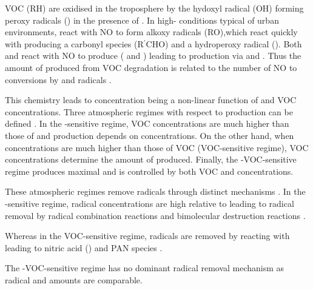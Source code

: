 VOC (RH) are oxidised in the troposphere by the hydoxyl radical (OH) forming peroxy radicals () in the presence of  . 
In high- conditions typical of urban environments,  react with NO  to form alkoxy radicals (RO),which react quickly with   producing a carbonyl species (R$^{\prime}$CHO) and a hydroperoxy radical ().
Both  and  react with NO to produce  ( and ) leading to  production via  and . 
Thus the amount of  produced from VOC degradation is related to the number of NO to  conversions by  and  radicals \citep{Atkinson:2000}.
\begin{reactionlist}
\end{reactionlist}

This chemistry leads to  concentration being a non-linear function of  and VOC concentrations.
Three atmospheric regimes with respect to  production can be defined \citep{Jenkin:2000}. 
In the -sensitive regime, VOC concentrations are much higher than those of  and  production depends on  concentrations. 
On the other hand, when  concentrations are much higher than those of VOC (VOC-sensitive regime), VOC concentrations determine the amount of  produced.
Finally, the -VOC-sensitive regime produces maximal  and is controlled by both VOC and  concentrations.

These atmospheric regimes remove radicals through distinct mechanisms \citep{Kleinman:1991}. 
In the -sensitive regime, radical concentrations are high relative to  leading to radical removal by radical combination reactions  and bimolecular destruction reactions  \citep{Kleinman:1994}.
\vspace{-5mm}
\begin{reactionlist}
\end{reactionlist}
Whereas in the VOC-sensitive regime, radicals are removed by reacting with  leading to nitric acid ()  and PAN species .
\vspace{-3mm}
\begin{reactionlist}
\end{reactionlist}
The -VOC-sensitive regime has no dominant radical removal mechanism as radical and  amounts are comparable.

